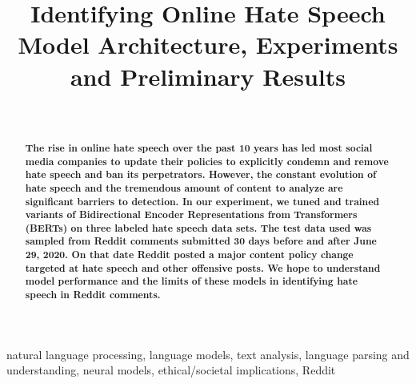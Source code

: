 \documentclass[conference]{IEEEtran}
\begin{document}
\title{Identifying Online Hate Speech \\
Model Architecture, Experiments and Preliminary Results\\
}

\author{
\and
{}
\and
{}
\
}

\maketitle

\begin{abstract}
\textbf{The rise in online hate speech over the past 10 years has led most social media companies to update their policies to explicitly condemn and remove hate speech and ban its perpetrators. However, the constant evolution of hate speech and the tremendous amount of content to analyze are significant barriers to detection. In our experiment, we tuned and trained variants of Bidirectional Encoder Representations from Transformers (BERTs) on three labeled hate speech data sets. The test data used was sampled from Reddit comments submitted 30 days before and after June 29, 2020. On that date Reddit posted a major content policy change targeted at hate speech and other offensive posts. We hope to understand model performance and the limits of these models in identifying hate speech in Reddit comments.}
\end{abstract}

\begin{IEEEkeywords}
natural language processing, language models, text analysis, language parsing and understanding, neural models, ethical/societal implications, Reddit
\end{IEEEkeywords}
\end{document}
